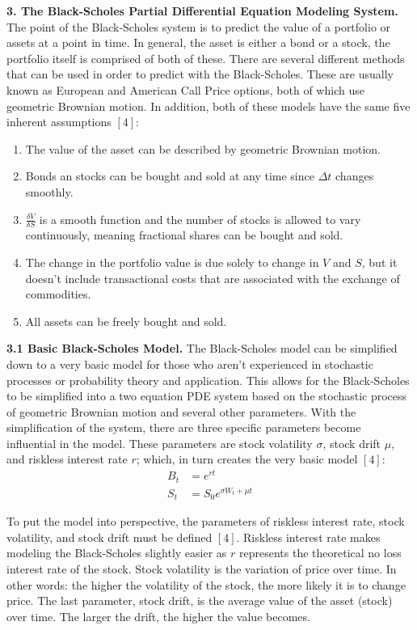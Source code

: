 \documentclass{report}
\begin{document}
	\textbf{3. The Black-Scholes Partial Differential Equation Modeling System.} The point of the Black-Scholes system is to predict the value of a portfolio or assets at a point in time. In general, the asset is either a bond or a stock, the portfolio itself is comprised of both of these. There are several different methods that can be used in order to predict with the Black-Scholes. These are usually known as European and American Call Price options, both of which use geometric Brownian motion. In addition, both of these models have the same five inherent assumptions $[4]$:
	\begin{enumerate}
		\item The value of the asset can be described by geometric Brownian motion.
		\item Bonds an stocks can be bought and sold at any time since $\Delta t$ changes smoothly.
		\item $\frac{\delta V}{\delta S}$ is a smooth function and the number of stocks is allowed to vary continuously, meaning fractional shares can be bought and sold.
		\item The change in the portfolio value is due solely to change in $V$ and $S$, but it doesn't include transactional costs that are associated with the exchange of commodities.
		\item All assets can be freely bought and sold.
	\end{enumerate}
	
	\textbf{3.1 Basic Black-Scholes Model.} The Black-Scholes model can be simplified down to a very basic model for those who aren't experienced in stochastic processes or probability theory and application. This allows for the Black-Scholes to be simplified into a two equation PDE system based on the stochastic process of geometric Brownian motion and several other parameters. With the simplification of the system, there are three specific parameters become influential in the model. These parameters are stock volatility $\sigma$, stock drift $\mu$, and riskless interest rate $r$; which, in turn creates the very basic model $[4]$:
	\begin{align*}
	B_t &= e^{rt} \\
	S_t &= S_0e^{\sigma W_t + \mu t}
	\end{align*}
	
	To put the model into perspective, the parameters of riskless interest rate, stock volatility, and stock drift must be defined $[4]$. Riskless interest rate makes modeling the Black-Scholes slightly easier as $r$ represents the theoretical no loss interest rate of the stock. Stock volatility is the variation of price over time. In other words: the higher the volatility of the stock, the more likely it is to change price. The last parameter, stock drift, is the average value of the asset (stock) over time. The larger the drift, the higher the value becomes.\\
	
\end{document}

